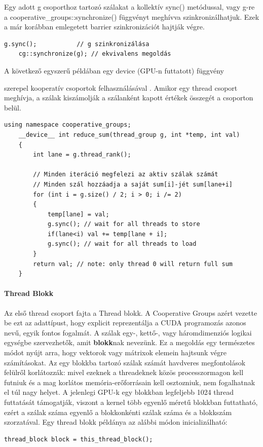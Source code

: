 Egy adott g csoporthoz tartozó szálakat a kollektív sync() metódussal, vagy g-re a cooperative\_groups::synchronize() függvényt meghívva szinkronizálhatjuk. Ezek a már korábban emlegetett barrier szinkronizációt hajtják végre.
\begin{lstlisting}[style=CStyle]
	g.sync();           // g szinkronizálása
	cg::synchronize(g); // ekvivalens megoldás
\end{lstlisting}

\hypertarget{reducesum}{A következő egyszerű példában egy device (GPU-n futtatott) függvény} szerepel kooperatív csoportok felhasználásával \cite{CUDAcoopgroups}. Amikor egy thread csoport meghívja, a szálak kiszámolják a szálanként kapott értékek összegét a csoporton belül.
\begin{lstlisting}[style=CStyle]
	using namespace cooperative_groups;
	__device__ int reduce_sum(thread_group g, int *temp, int val)
	{
		int lane = g.thread_rank();
		
		// Minden iteráció megfelezi az aktiv szálak számát
		// Minden szál hozzáadja a saját sum[i]-jét sum[lane+i]
		for (int i = g.size() / 2; i > 0; i /= 2)
		{
			temp[lane] = val;
			g.sync(); // wait for all threads to store
			if(lane<i) val += temp[lane + i];
			g.sync(); // wait for all threads to load
		}
		return val; // note: only thread 0 will return full sum
	}
\end{lstlisting}

\paragraph{Thread Blokk}
Az első thread csoport fajta a Thread blokk. A Cooperative Groups azért vezette be ezt az adattípust, hogy explicit reprezentálja a CUDA programozás azonos nevű, egyik fontos fogalmát. A szálak egy-, kettő-, vagy háromdimenziós logikai egységbe szervezhetők, amit \textbf{blokk}nak nevezünk. Ez a megoldás egy természetes módot nyújt arra, hogy vektorok vagy mátrixok elemein hajtsunk végre számításokat. 
Az egy blokkba tartozó szálak számát havdveres megfontolások felülről korlátozzák: mivel ezeknek a threadeknek közös processzormagon kell futniuk és a mag korlátos memória-erőforrásain kell osztozniuk, nem fogalhatnak el túl nagy helyet. A jelenlegi GPU-k egy blokkban legfeljebb 1024 thread futtatását támogatják, viszont a kernel több egyenlő méretű blokkban futtatható, ezért a szálak száma egyenlő a blokkonkénti szálak száma és a blokkszám szorzatával. \cite{kvantum_optim}
Egy thread blokk példánya az alábbi módon inicializálható:
\begin{lstlisting}[style=CStyle]
	thread_block block = this_thread_block();
\end{lstlisting}

